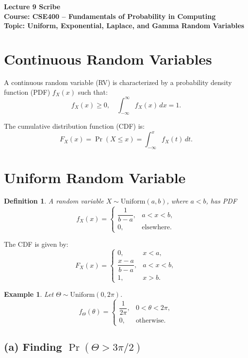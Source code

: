 \documentclass[11pt]{article}
\newtheorem{definition}{Definition}
\newtheorem{example}{Example}
\begin{document}
\begin{center}
\textbf{\Large Lecture 9 Scribe}\\[0.2cm]
\textbf{Course: CSE400 -- Fundamentals of Probability in Computing}\\
\textbf{Topic: Uniform, Exponential, Laplace, and Gamma Random Variables}
\end{center}

\section{Continuous Random Variables}

A continuous random variable (RV) is characterized by a probability density function (PDF) $f_X(x)$ such that:
\[
f_X(x) \ge 0, \quad \int_{-\infty}^{\infty} f_X(x)\,dx = 1.
\]

The cumulative distribution function (CDF) is:
\[
F_X(x) = \Pr(X \le x) = \int_{-\infty}^{x} f_X(t)\,dt.
\]

\section{Uniform Random Variable}

\begin{definition}
A random variable $X \sim \text{Uniform}(a,b)$, where $a<b$, has PDF
\[
f_X(x) =
\begin{cases}
\dfrac{1}{b-a}, & a < x < b,\\
0, & \text{elsewhere}.
\end{cases}
\]
\end{definition}

The CDF is given by:
\[
F_X(x) =
\begin{cases}
0, & x < a,\\
\dfrac{x-a}{b-a}, & a < x < b,\\
1, & x > b.
\end{cases}
\]

\begin{example}
Let $\Theta \sim \text{Uniform}(0,2\pi)$.
\[
f_\Theta(\theta) =
\begin{cases}
\dfrac{1}{2\pi}, & 0 < \theta < 2\pi,\\
0, & \text{otherwise}.
\end{cases}
\]
\end{example}

\subsection*{(a) Finding $\Pr(\Theta > 3\pi/2)$}
\end{document}
